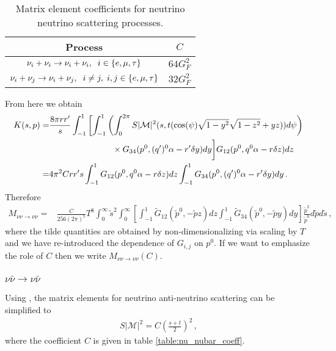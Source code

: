 \begin{table}[ht]
\centering 
\begin{tabular}{|c|c|}
\hline
Process &$C$ \\
\hline
$\nu_i+\nu_i\rightarrow\nu_i+\nu_i,\hspace{2mm} i\in\{e,\mu,\tau\}$& $64 G_F^2$\\
\hline
$\nu_i+\nu_j\rightarrow\nu_i+\nu_j,\hspace{2mm} i\neq j, \hspace{1mm} i,j\in\{e,\mu,\tau\}$& $32 G_F^2$\\
\hline
\end{tabular}
\caption{Matrix element coefficients for neutrino neutrino scattering processes.}
\label{table:nu_nu_coeff}
\end{table}
From here we obtain
\begin{align}
K(s,p)=&\frac{8\pi rr^{\prime}}{s}\int_{-1}^1 \left[\int_{-1}^1\left(\int_0^{2\pi}S|\mathcal{M}|^2 (s,t(\cos(\psi)\sqrt{1-y^2}\sqrt{1-z^2}+yz))d\psi\right)\right.\\
&\hspace{26mm}\times G_{34}(p^0,(q^{\prime})^0\alpha-r^{\prime}\delta y) dy\bigg] G_{12}(p^0,q^0\alpha-r\delta z)dz\notag\\
=& 4\pi^2 Crr^{\prime}s \int_{-1}^1 G_{12}(p^0,q^0\alpha-r\delta z)dz \int_{-1}^1G_{34}(p^0,(q^{\prime})^0\alpha-r^{\prime}\delta y) dy\,.\notag
\end{align}
Therefore
\begin{align}
M_{\nu\nu\rightarrow\nu\nu}=&\frac{C}{256(2\pi)^5 } T^8\!\!\!\int_{0}^\infty\!\!\!\tilde{s}^2\!\!\int_0^\infty  \left[\int_{-1}^1 \tilde{G}_{12}(\tilde p^0,-\tilde{p} z)dz \int_{-1}^1\tilde{G}_{34}(\tilde p^0,-\tilde{p} y) dy\right]\frac{\tilde{p}^2}{\tilde{p}^0}d\tilde{p}d\tilde{s}\,,
\end{align}
where the tilde quantities are obtained by non-dimensionalizing via scaling by $T$ and we have re-introduced the dependence of $G_{i,j}$ on $p^0$. If we want to emphasize the role of $C$ then we write $M_{\nu\nu\rightarrow\nu\nu}(C)$.




\subsubsection{$\nu\bar\nu\rightarrow \nu\bar\nu$ }
Using , the matrix elements for neutrino anti-neutrino scattering can be simplified to
\begin{align}
S|\mathcal{M}|^2=C\left(\frac{s+t}{2}\right)^2\,,
\end{align}
where the coefficient $C$ is given in table \ref{table:nu_nubar_coeff}.

